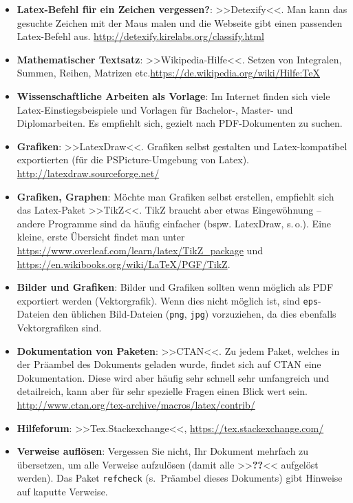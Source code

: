 \documentclass[11pt, a4paper, oneside, openright]{article}
\newcommand \sieheoben{s.\,o.\xspace }
\newcommand \etc{etc.\xspace }
\begin{document}
\begin{itemize}
    \item \textbf{Latex-Befehl für ein Zeichen vergessen?}: >>Detexify<<. Man kann das gesuchte Zeichen mit der Maus malen und die Webseite gibt einen passenden Latex-Befehl aus. \url{http://detexify.kirelabs.org/classify.html}
    
    \item \textbf{Mathematischer Textsatz}: >>Wikipedia-Hilfe<<. Setzen von Integralen, Summen, Reihen, Matrizen \etc \url{https://de.wikipedia.org/wiki/Hilfe:TeX}
    
    \item \textbf{Wissenschaftliche Arbeiten als Vorlage}: Im Internet finden sich viele Latex-Einstiegsbeispiele und Vorlagen für Bachelor-, Master- und Diplomarbeiten. Es empfiehlt sich, gezielt nach PDF-Dokumenten zu suchen.
    
    \item \textbf{Grafiken}: >>LatexDraw<<. Grafiken selbst gestalten und Latex-kompatibel exportierten (für die PSPicture-Umgebung von Latex). \url{http://latexdraw.sourceforge.net/}
    
    \item \textbf{Grafiken, Graphen}: Möchte man Grafiken selbst erstellen, empfiehlt sich das Latex-Paket >>TikZ<<. TikZ braucht aber etwas Eingewöhnung -- andere Programme sind da häufig einfacher (bspw. LatexDraw, \sieheoben). Eine kleine, erste Übersicht findet man unter \url{https://www.overleaf.com/learn/latex/TikZ_package} und \url{https://en.wikibooks.org/wiki/LaTeX/PGF/TikZ}.
    
    \item \textbf{Bilder und Grafiken}: Bilder und Grafiken sollten wenn möglich als PDF exportiert werden (Vektorgrafik). Wenn dies nicht möglich ist, sind \texttt{eps}-Dateien den üblichen Bild-Dateien (\texttt{png}, \texttt{jpg}) vorzuziehen, da dies ebenfalls Vektorgrafiken sind.
    
    \item \textbf{Dokumentation von Paketen}: >>CTAN<<. Zu jedem Paket, welches in der Präambel des Dokuments geladen wurde, findet sich auf CTAN eine Dokumentation. Diese wird aber häufig sehr schnell sehr umfangreich und detailreich, kann aber für sehr spezielle Fragen einen Blick wert sein. \url{http://www.ctan.org/tex-archive/macros/latex/contrib/}
    
    \item \textbf{Hilfeforum}: >>Tex.Stackexchange<<, \url{https://tex.stackexchange.com/}
    
    \item \textbf{Verweise auflösen}: Vergessen Sie nicht, Ihr Dokument mehrfach zu übersetzen, um alle Verweise aufzulösen (damit alle >>\textbf{??}<< aufgelöst werden). Das Paket \texttt{refcheck} (s.~Präambel dieses Dokuments) gibt Hinweise auf kaputte Verweise.
\end{itemize}
\end{document}
